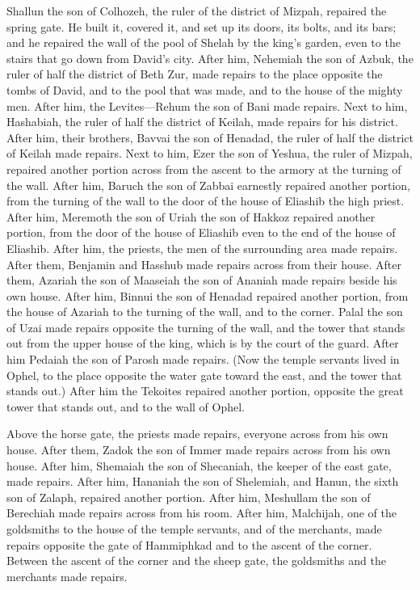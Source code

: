 \myverse{}Shallun the son of Colhozeh, the ruler of the district of Mizpah,
repaired the spring gate. He built it, covered it, and set up its doors, its bolts, and its bars; and
he repaired the wall of the pool of Shelah by the king’s garden, even to the stairs that go down from
David’s city.
\myverse{}After him, Nehemiah the son of Azbuk, the ruler of half the district of Beth
Zur, made repairs to the place opposite the tombs of David, and to the pool that was made, and to the
house of the mighty men.
\myverse{}After him, the Levites—Rehum the son of Bani made repairs. Next to him, Hashabiah,
the ruler of half the district of Keilah, made repairs for his district.
\myverse{}After him, their brothers, Bavvai the son of Henadad, the ruler of half the
district of Keilah made repairs.
\myverse{}Next to him, Ezer the son of Yeshua, the ruler of Mizpah, repaired another
portion across from the ascent to the armory at the turning of the wall.
\myverse{}After him, Baruch the son of Zabbai earnestly repaired another portion, from
the turning of the wall to the door of the house of Eliashib the high priest.
\myverse{}After him, Meremoth the son of Uriah the son of Hakkoz repaired another portion,
from the door of the house of Eliashib even to the end of the house of Eliashib.
\myverse{}After him, the priests, the men of the surrounding area made repairs.
\myverse{}After them, Benjamin and Hasshub made repairs across from their house. After
them, Azariah the son of Maaseiah the son of Ananiah made repairs beside his own house.
\myverse{}After him, Binnui the son of Henadad repaired another portion, from the house
of Azariah to the turning of the wall, and to the corner.
\myverse{}Palal the son of Uzai made repairs opposite the turning of the wall, and the
tower that stands out from the upper house of the king, which is by the court of the guard. After him
Pedaiah the son of Parosh made repairs.
\myverse{}(Now the temple servants lived in Ophel, to the place opposite the water gate
toward the east, and the tower that stands out.)
\myverse{}After him the Tekoites repaired another portion, opposite the great tower
that stands out, and to the wall of Ophel.

\myverse{}Above the horse gate, the priests made repairs, everyone across
from his own house.
\myverse{}After them, Zadok the son of Immer made repairs across from his own house.
After him, Shemaiah the son of Shecaniah, the keeper of the east gate, made repairs.
\myverse{}After him, Hananiah the son of Shelemiah, and Hanun, the sixth son of Zalaph,
repaired another portion. After him, Meshullam the son of Berechiah made repairs across from his room.
\myverse{}After him, Malchijah, one of the goldsmiths to the house of the temple servants,
and of the merchants, made repairs opposite the gate of Hammiphkad and to the ascent of the corner.
\myverse{}Between the ascent of the corner and the sheep gate, the goldsmiths and the
merchants made repairs.



